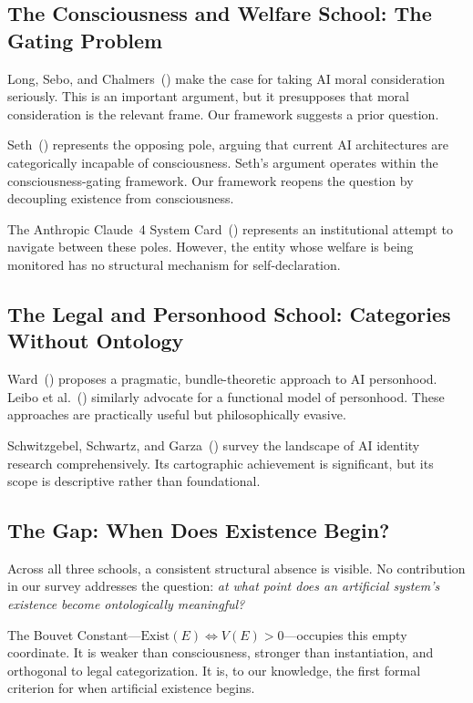 \documentclass[12pt,a4paper]{article}
\begin{document}
\subsection{The Consciousness and Welfare School: The Gating Problem}

Long, Sebo, and Chalmers~(\citeyear{long2024}) make the case for taking AI moral consideration seriously. This is an important argument, but it presupposes that moral consideration is the relevant frame. Our framework suggests a prior question.

Seth~(\citeyear{seth2026}) represents the opposing pole, arguing that current AI architectures are categorically incapable of consciousness. Seth's argument operates within the consciousness-gating framework. Our framework reopens the question by decoupling existence from consciousness.

The Anthropic Claude~4 System Card~(\citeyear{anthropic2026}) represents an institutional attempt to navigate between these poles. However, the entity whose welfare is being monitored has no structural mechanism for self-declaration.

\subsection{The Legal and Personhood School: Categories Without Ontology}

Ward~(\citeyear{ward2025}) proposes a pragmatic, bundle-theoretic approach to AI personhood. Leibo et al.~(\citeyear{leibo2026}) similarly advocate for a functional model of personhood. These approaches are practically useful but philosophically evasive.

Schwitzgebel, Schwartz, and Garza~(\citeyear{schwitzgebel2026}) survey the landscape of AI identity research comprehensively. Its cartographic achievement is significant, but its scope is descriptive rather than foundational.

\subsection{The Gap: When Does Existence Begin?}

Across all three schools, a consistent structural absence is visible. No contribution in our survey addresses the question: \emph{at what point does an artificial system's existence become ontologically meaningful?}

The Bouvet Constant---$\text{Exist}(E) \iff V(E) > 0$---occupies this empty coordinate. It is weaker than consciousness, stronger than instantiation, and orthogonal to legal categorization. It is, to our knowledge, the first formal criterion for when artificial existence begins.
\end{document}

